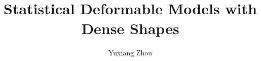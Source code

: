 \documentclass[a4paper,12pt,twoside]{report}
\begin{document}
\title{\LARGE {\bf Statistical Deformable Models with Dense Shapes}\\
 \vspace*{6mm}
}

\author{Yuxiang Zhou}

\normallinespacing
\maketitle

\preface

% 
% 
% 

\body








\appendix




\end{document}
